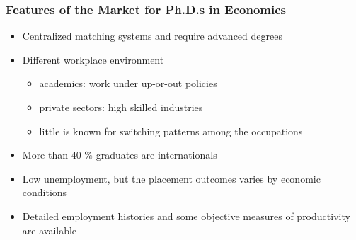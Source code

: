 \documentclass[11pt]{beamer}
\begin{document}
\begin{frame}
	\frametitle{Features of the Market for Ph.D.s in Economics}
	\begin{itemize}
		
							    \item Centralized matching systems and require advanced degrees
							    \vspace{1.5mm}
							    \item Different workplace environment
							    \begin{itemize}
							    	\item academics: work under up-or-out policies
							    	\vspace{.5 mm} %
							    	\item private sectors:  high skilled industries
							 	    \vspace{.5 mm}
							 	    \item little is known for switching patterns among the occupations   
						     \end{itemize}
					     \vspace{1.5mm}
					     		\item More than 40 \% graduates are internationals
			   				    \vspace{1.5mm}
			   				    \item Low unemployment, but the placement outcomes varies by economic conditions
			   				   \vspace{1.5mm}
			   				    \item Detailed employment histories and some objective measures of productivity are available
		
	\end{itemize}
\end{frame}
\end{document}
